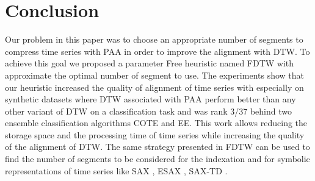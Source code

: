 \section{Conclusion}
\label{sec:4}
Our problem in this paper was to choose an appropriate number of segments to compress time series with PAA in order to improve the alignment with DTW. To achieve this goal we proposed a parameter Free heuristic named FDTW with approximate the optimal number of segment to use. The experiments show that our heuristic increased the quality of alignment of time series with especially on synthetic datasets where DTW associated with PAA perform better than any other variant of DTW on a classification task and was rank 3/37 behind two ensemble classification algorithms COTE and EE. This work allows reducing the storage space and the processing time of time series while increasing the quality of the alignment of DTW. 
The same strategy presented in FDTW can be used to find the number of segments to be considered for the indexation and for symbolic representations of time series like SAX \cite{lin2003symbolic}, ESAX \cite{lkhagva2006extended}, SAX-TD \cite{sun2014improvement}.
